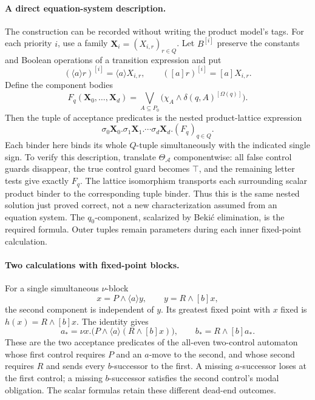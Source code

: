 \paragraph{A direct equation-system description.}
The construction can be recorded without
writing the product model's tags.
For each priority \(i\), use a
family \(\mathbf X_i=(X_{i,r})_{r\in Q}\).
Let \(B^{[i]}\) preserve the
constants and Boolean operations
of a transition expression and put
\[
 (\langle a\rangle r)^{[i]}=\langle a\rangle X_{i,r},
 \qquad
 ([a]r)^{[i]}=[a]X_{i,r}.
\]
Define the component bodies
\[
 F_q(\mathbf X_0,\ldots,\mathbf X_d)=
   \bigvee_{A\subseteq P_0}
      \bigl(\chi_A\land
                    \delta(q,A)^{[\Omega(q)]}\bigr).
\]
Then the tuple of acceptance predicates
is the nested product-lattice expression
\[
 \sigma_0\mathbf X_0.\sigma_1\mathbf X_1.
       \cdots\sigma_d\mathbf X_d.
                      (F_q)_{q\in Q}.
\]
Each binder here binds its whole
\(Q\)-tuple simultaneously with
the indicated single sign.
To verify this description, translate
\(\Theta_{\mathcal A}\) componentwise:
all false control guards disappear,
the true control guard becomes
\(\top\), and the remaining
letter tests give exactly \(F_q\).
The lattice isomorphism transports
each surrounding scalar product
binder to the corresponding tuple
binder. Thus this is the same
nested solution just proved correct,
not a new characterization assumed
from an equation system.
The \(q_0\)-component, scalarized
by Beki\'c elimination, is the
required formula. Outer tuples
remain parameters during each
inner fixed-point calculation.

\paragraph{Two calculations with fixed-point blocks.}
For a single simultaneous
\(\nu\)-block
\[
 x=P\land\langle a\rangle y,\qquad
 y=R\land[b]x,
\]
the second component is independent
of \(y\). Its greatest fixed point
with \(x\) fixed is
\(h(x)=R\land[b]x\).
The identity gives
\[
 a_*=\nu x.\bigl(P\land
              \langle a\rangle(R\land[b]x)\bigr),
 \qquad
 b_*=R\land[b]a_*.
\]
These are the two acceptance
predicates of the all-even
two-control automaton whose first
control requires \(P\) and an
\(a\)-move to the second, and whose
second requires \(R\) and sends
every \(b\)-successor to the first.
A missing \(a\)-successor loses
at the first control; a missing
\(b\)-successor satisfies the
second control's modal obligation.
The scalar formulas retain these
different dead-end outcomes.

